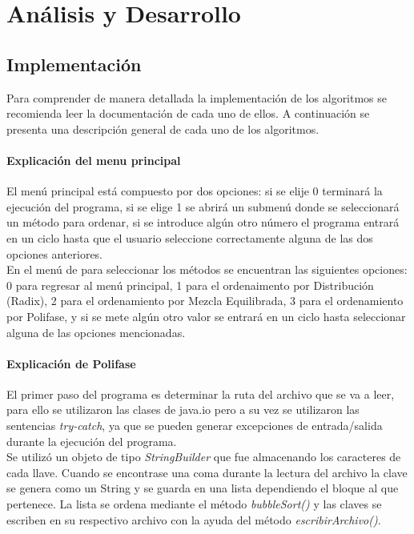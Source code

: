 \documentclass{article}
\begin{document}
	\section{Análisis y Desarrollo}
		
	\subsection{Implementación}
	 Para comprender de manera detallada la implementación de los algoritmos se recomienda leer la documentación de cada uno de ellos.
	 A continuación se presenta una descripción general de cada uno de los algoritmos.
	
	\paragraph*{Explicación del menu principal}
	El menú principal está compuesto por dos opciones: si se elije 0 terminará la ejecución del programa, si se elige 1 se abrirá un submenú donde
	se seleccionará un método para ordenar, si se introduce algún otro número el programa entrará en un ciclo hasta que el usuario seleccione
	correctamente alguna de las dos opciones anteriores.\\
	
	En el menú de para seleccionar los métodos se encuentran las siguientes opciones: 0 para regresar al menú principal, 1 para el ordenaimento por
	Distribución (Radix), 2 para el ordenamiento por Mezcla Equilibrada, 3 para el ordenamiento por Polifase, y si se mete algún otro valor se
	entrará en un ciclo hasta seleccionar alguna de las opciones mencionadas.\\
	
	\paragraph*{Explicación de Polifase}
	El primer paso del programa es determinar la ruta del archivo que se va a leer, para ello se utilizaron las clases de java.io pero a su vez
	se utilizaron las sentencias \textit{try-catch}, ya que se pueden generar excepciones de entrada/salida durante la ejecución del programa.\\
	
	Se utilizó un objeto de tipo \textit{StringBuilder} que fue almacenando los caracteres de cada llave. Cuando se encontrase una coma durante 
	la lectura del archivo la clave se genera como un String y se guarda en una lista dependiendo el bloque al que pertenece. La lista se ordena 
	mediante el método \textit{bubbleSort()} y las claves se escriben en su respectivo archivo con la ayuda del método \textit{escribirArchivo()}.\\
	
\end{document}
